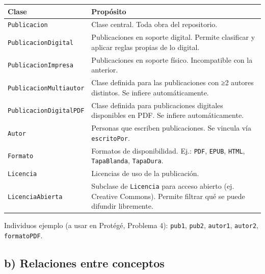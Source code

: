 {\def\LTcaptype{none} %
\begin{longtable}[]{@{}
  >{\raggedright\arraybackslash}p{}
  >{\raggedright\arraybackslash}p{}@{}}
\toprule\noalign{}
\begin{minipage}[b]{\linewidth}\raggedright
Clase
\end{minipage} & \begin{minipage}[b]{\linewidth}\raggedright
Propósito
\end{minipage} \\
\midrule\noalign{}
\endhead
\bottomrule\noalign{}
\endlastfoot
\texttt{Publicacion} & Clase central. Toda obra del repositorio. \\
\texttt{PublicacionDigital} & Publicaciones en soporte digital. Permite
clasificar y aplicar reglas propias de lo digital. \\
\texttt{PublicacionImpresa} & Publicaciones en soporte físico.
Incompatible con la anterior. \\
\texttt{PublicacionMultiautor} & Clase definida para las publicaciones
con ≥2 autores distintos. Se infiere automáticamente. \\
\texttt{PublicacionDigitalPDF} & Clase definida para publicaciones
digitales disponibles en PDF. Se infiere automáticamente. \\
\texttt{Autor} & Personas que escriben publicaciones. Se vincula vía
\texttt{escritoPor}. \\
\texttt{Formato} & Formatos de disponibilidad. Ej.: \texttt{PDF},
\texttt{EPUB}, \texttt{HTML}, \texttt{TapaBlanda}, \texttt{TapaDura}. \\
\texttt{Licencia} & Licencias de uso de la publicación. \\
\texttt{LicenciaAbierta} & Subclase de \texttt{Licencia} para acceso
abierto (ej. Creative Commons). Permite filtrar qué se puede difundir
libremente. \\
\end{longtable}
}

Individuos ejemplo (a usar en Protégé, Problema 4): \texttt{pub1},
\texttt{pub2}, \texttt{autor1}, \texttt{autor2}, \texttt{formatoPDF}.

\subsection{b) Relaciones entre
conceptos}\label{b-relaciones-entre-conceptos}

